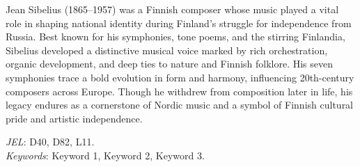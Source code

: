 Jean Sibelius (1865–1957) was a Finnish composer whose music played a vital role in shaping national identity during Finland’s struggle for independence from Russia. Best known for his symphonies, tone poems, and the stirring Finlandia, Sibelius developed a distinctive musical voice marked by rich orchestration, organic development, and deep ties to nature and Finnish folklore. His seven symphonies trace a bold evolution in form and harmony, influencing 20th-century composers across Europe. Though he withdrew from composition later in life, his legacy endures as a cornerstone of Nordic music and a symbol of Finnish cultural pride and artistic independence. 

\vspace{1em}
\textit{JEL}: D40, D82, L11.\\
\textit{Keywords}: Keyword 1, Keyword 2, Keyword 3.
